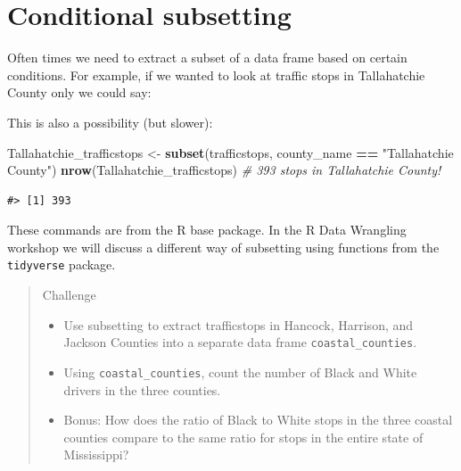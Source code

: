 \documentclass[]{book}
\newenvironment{Shaded}{\begin{snugshade}}{\end{snugshade}}
\newcommand{\KeywordTok}[1]{\textcolor[rgb]{0.13,0.29,0.53}{\textbf{#1}}}
\newcommand{\StringTok}[1]{\textcolor[rgb]{0.31,0.60,0.02}{#1}}
\newcommand{\CommentTok}[1]{\textcolor[rgb]{0.56,0.35,0.01}{\textit{#1}}}
\newcommand{\OperatorTok}[1]{\textcolor[rgb]{0.81,0.36,0.00}{\textbf{#1}}}
\newcommand{\NormalTok}[1]{#1}
\providecommand{\tightlist}{%
  \setlength{\itemsep}{0pt}\setlength{\parskip}{0pt}}
\theoremstyle{definition}
\theoremstyle{definition}
\theoremstyle{remark}
\begin{document}
\section{Conditional subsetting}\label{conditional-subsetting-1}

Often times we need to extract a subset of a data frame based on certain
conditions. For example, if we wanted to look at traffic stops in
Tallahatchie County only we could say:

\begin{Shaded}
\end{Shaded}

This is also a possibility (but slower):

\begin{Shaded}
\begin{Highlighting}[]
\NormalTok{Tallahatchie_trafficstops <-}\StringTok{ }\KeywordTok{subset}\NormalTok{(trafficstops, county_name }\OperatorTok{==}\StringTok{ "Tallahatchie County"}\NormalTok{)}
\KeywordTok{nrow}\NormalTok{(Tallahatchie_trafficstops) }\CommentTok{# 393 stops in Tallahatchie County!}
\end{Highlighting}
\end{Shaded}

\begin{verbatim}
#> [1] 393
\end{verbatim}

These commands are from the R base package. In the R Data Wrangling
workshop we will discuss a different way of subsetting using functions
from the \texttt{tidyverse} package.

\begin{quote}
Challenge

\begin{itemize}
\tightlist
\item
  Use subsetting to extract trafficstops in Hancock, Harrison, and
  Jackson Counties into a separate data frame
  \texttt{coastal\_counties}.
\item
  Using \texttt{coastal\_counties}, count the number of Black and White
  drivers in the three counties.
\item
  Bonus: How does the ratio of Black to White stops in the three coastal
  counties compare to the same ratio for stops in the entire state of
  Mississippi?
\end{itemize}
\end{quote}
\end{document}
